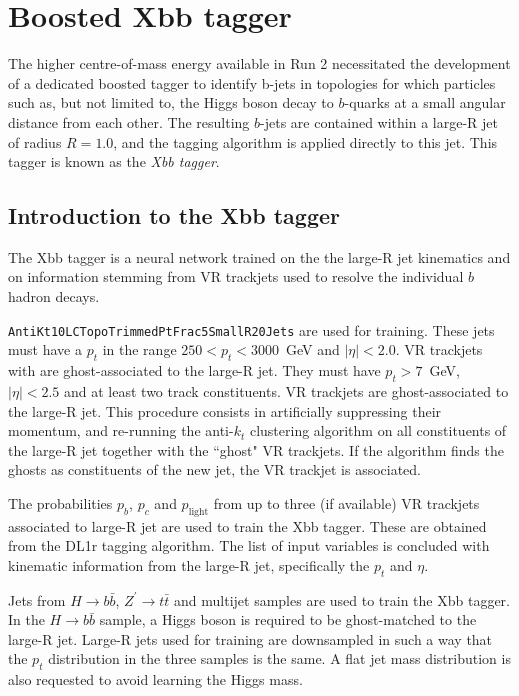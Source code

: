 \documentclass[10pt,a4paper]{book}
\author{Alberto Rescia}
\newcommand{\code}[1]{\texttt{#1}}
\begin{document}
\chapter{Boosted Xbb tagger}

The higher centre-of-mass energy available in Run 2 necessitated the development of a dedicated boosted tagger to identify b-jets in topologies for which particles such as, but not limited to, the Higgs boson decay to $b$-quarks at a small angular distance from each other. The resulting $b$-jets are contained within a large-R jet of radius $R = 1.0$, and the tagging algorithm is applied directly to this jet. This tagger is known as the \emph{Xbb tagger}.

\section{Introduction to the Xbb tagger}
The Xbb tagger is a neural network trained on the the large-R jet kinematics and on information stemming from VR trackjets used to resolve the individual $b$ hadron decays. 

\code{AntiKt10LCTopoTrimmedPtFrac5SmallR20Jets} are used for training. These jets must have a $p_t$ in the range $250 < p_t < 3000$~GeV and $\vert \eta\vert < 2.0$. VR trackjets with are ghost-associated to the large-R jet. They must have $p_t > 7$~GeV, $\vert \eta \vert < 2.5$ and at least two track constituents. VR trackjets are ghost-associated to the large-R jet. This procedure consists in artificially suppressing their momentum, and re-running the anti-$k_t$ clustering algorithm on all constituents of the large-R jet together with the ``ghost" VR trackjets. If the algorithm finds the ghosts as constituents of the new jet, the VR trackjet is associated.

The probabilities $p_b$, $p_c$ and $p_\text{light}$ from up to three (if available) VR trackjets associated to large-R jet are used to train the Xbb tagger. These are obtained from the DL1r tagging algorithm. The list of input variables is concluded with kinematic information from the large-R jet, specifically the $p_t$ and $\eta$. 

Jets from $H\rightarrow b\bar{b}$, $Z^\prime \rightarrow t\bar{t}$ and multijet samples are used to train the Xbb tagger. In the $H\rightarrow b\bar{b}$ sample, a Higgs boson is required to be ghost-matched to the large-R jet. Large-R jets used for training are downsampled in such a way that the $p_t$ distribution in the three samples is the same. A flat jet mass distribution is also requested to avoid learning the Higgs mass.
\end{document}
